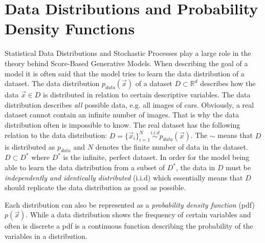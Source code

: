 \section[Data Distributions and Probability Density Functions]{Data Distributions and Probability Density Functions%
    } \label{sec:3.3}
Statistical Data Distributions and Stochastic Processes play a large role in the theory behind Score-Based Generative Models. When describing the goal of a model it is often said that the model tries to learn the data distribution of a dataset. The data distribution $p_{data}(\vec{x})$ of a dataset $D\subset\mathbb{R}^d$  describes how the data $\vec{x}\in D$ is distributed in relation to certain descriptive variables. The data distribution describes \textit{all} possible data, e.g. all images of cars. Obviously, a real dataset cannot contain an infinite number of images. That is why the data distribution often is impossible to know. The real dataset has the following relation to the data distribution: $D=\{\vec{x}_i\}_{i=1}^N\overset{i.i.d}{\sim}p_{data}(\vec{x})$. The $\sim$ means that $D$ is distributed as $p_{data}$ and $N$ denotes the finite number of data in the dataset. $D\subset D^*$ where $D^*$ is the infinite, perfect dataset. In order for the model being able to learn the data distribution from a subset of $D^*$, the data in $D$ must be \textit{independently and identically distributed} (i.i.d) which essentially means that $D$ should replicate the data distribution as good as possible.

Each distribution can also be represented as a \textit{probability density function} (pdf) $p(\vec{x})$. While a data distribution shows the frequency of certain variables and often is discrete a pdf is a continuous function describing the probability of the variables in a distribution. 